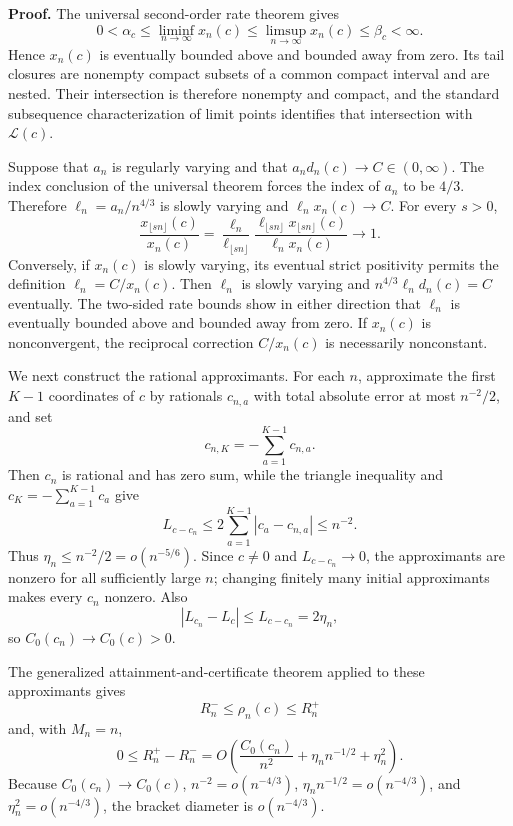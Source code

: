 \textbf{Proof.}
The universal second-order rate theorem gives
\[
 0<\alpha_c\leq\liminf_{n\to\infty}x_n(c)
 \leq\limsup_{n\to\infty}x_n(c)\leq\beta_c<\infty.
\]
Hence \(x_n(c)\) is eventually bounded above and bounded away from zero.  Its tail closures are nonempty compact subsets of a common compact interval and are nested.  Their intersection is therefore nonempty and compact, and the standard subsequence characterization of limit points identifies that intersection with \(\mathcal L(c)\).

Suppose that \(a_n\) is regularly varying and that \(a_nd_n(c)\to C\in(0,\infty)\).  The index conclusion of the universal theorem forces the index of \(a_n\) to be \(4/3\).  Therefore \(\ell_n=a_n/n^{4/3}\) is slowly varying and \(\ell_nx_n(c)\to C\).  For every \(s>0\),
\[
 \frac{x_{\lfloor sn\rfloor}(c)}{x_n(c)}
 =\frac{\ell_n}{\ell_{\lfloor sn\rfloor}}
 \frac{\ell_{\lfloor sn\rfloor}x_{\lfloor sn\rfloor}(c)}
 {\ell_nx_n(c)}\longrightarrow1.
\]
Conversely, if \(x_n(c)\) is slowly varying, its eventual strict positivity permits the definition \(\ell_n=C/x_n(c)\).  Then \(\ell_n\) is slowly varying and \(n^{4/3}\ell_nd_n(c)=C\) eventually.  The two-sided rate bounds show in either direction that \(\ell_n\) is eventually bounded above and bounded away from zero.  If \(x_n(c)\) is nonconvergent, the reciprocal correction \(C/x_n(c)\) is necessarily nonconstant.

We next construct the rational approximants.  For each \(n\), approximate the first \(K-1\) coordinates of \(c\) by rationals \(c_{n,a}\) with total absolute error at most \(n^{-2}/2\), and set
\[
 c_{n,K}=-\sum_{a=1}^{K-1}c_{n,a}.
\]
Then \(c_n\) is rational and has zero sum, while the triangle inequality and \(c_K=-\sum_{a=1}^{K-1}c_a\) give
\[
 L_{c-c_n}\leq
 2\sum_{a=1}^{K-1}|c_a-c_{n,a}|\leq n^{-2}.
\]
Thus \(\eta_n\leq n^{-2}/2=o(n^{-5/6})\).  Since \(c\neq0\) and \(L_{c-c_n}\to0\), the approximants are nonzero for all sufficiently large \(n\); changing finitely many initial approximants makes every \(c_n\) nonzero.  Also
\[
 |L_{c_n}-L_c|\leq L_{c-c_n}=2\eta_n,
\]
so \(C_0(c_n)\to C_0(c)>0\).

The generalized attainment-and-certificate theorem applied to these approximants gives
\[
 R_n^-\leq\rho_n(c)\leq R_n^+
\]
and, with \(M_n=n\),
\[
 0\leq R_n^+-R_n^-
 =O\!\left(
 \frac{C_0(c_n)}{n^2}+\eta_nn^{-1/2}+\eta_n^2
 \right).
\]
Because \(C_0(c_n)\to C_0(c)\), \(n^{-2}=o(n^{-4/3})\), \(\eta_nn^{-1/2}=o(n^{-4/3})\), and \(\eta_n^2=o(n^{-4/3})\), the bracket diameter is \(o(n^{-4/3})\).

